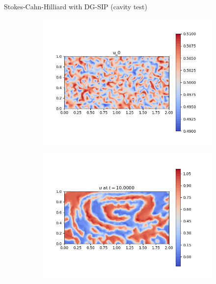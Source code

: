 \begin{frame}{Stokes-Cahn-Hilliard with DG-SIP {\small(cavity test)}}
	\vspace{-0.3cm}
	\begin{figure}[t]
		\begin{subfigure}{0.49\textwidth}
			\centering
			\includegraphics[scale=0.28]{img/stokes-cahn-hilliard/u_stokes_initial_condition.png}
		\end{subfigure}
		\hspace*{-1.5cm}
		\begin{subfigure}{0.49\textwidth}
			\centering
			\includegraphics[scale=0.28]{img/stokes-cahn-hilliard/u_DG-SIP-Sig+Eyre_stokes_nt-40000_t-10.00000_P1.png}
		\end{subfigure}

\end{figure}
\end{frame}
